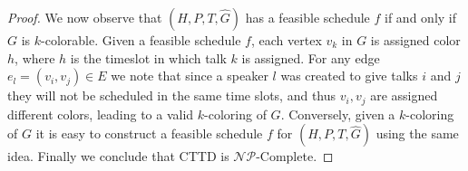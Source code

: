 \documentclass[]{article}
\theoremstyle{definition}
\theoremstyle{remark}
\numberwithin{equation}{section}
\newcommand{\cNP}{$\mathcal{NP}$}
\begin{document}
\begin{proof}
We now observe that $(H, P, T, \hat G)$ has a feasible schedule $f$ if and only if $G$ is $k$-colorable.
Given a feasible schedule $f$, each vertex $v_k$ in $G$ is assigned color $h$, where $h$ is the timeslot in which talk $k$ is assigned.
For any edge $e_l=(v_i,v_j)\in E$ we note that since a speaker $l$ was created to give talks $i$ and $j$ they will not be scheduled in the same time slots, and thus $v_i,v_j$ are assigned different colors, leading to a valid $k$-coloring of $G$.
Conversely, given a $k$-coloring of $G$ it is easy to construct a feasible schedule $f$ for $(H, P, T, \hat G)$ using the same idea.
Finally we conclude that CTTD is \cNP-Complete.
\end{proof}
\end{document}
